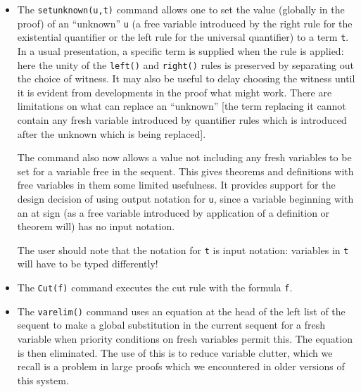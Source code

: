 \documentclass{article}
\begin{document}
\begin{itemize}
I have also added reflexivity of equality as an axiom, and the {\tt done()} command handles this.  This may have dynamic effects
if the prover can make the terms in an equation equal by setting unknowns suitably.  The other rules prove reflexivity of equality, but this
should remove lots of junk lines from proofs.

Where the {\tt done} command fails, one might want to use {\tt back()} to restore the previous state, because the prover might have
made undesired global substitutions for unknowns.

\item  The {\tt setunknown(u,t)} command allows one to set the value (globally in the proof) of an ``unknown'' {\tt u} (a free variable introduced by the right rule for the existential quantifier or the left rule for the universal quantifier) to a term {\tt t}.  In a usual presentation, a specific term is supplied when the rule is applied:  here the unity of the {\tt left()} and {\tt right()} rules is preserved by separating out the choice of witness.  It may also be useful to delay choosing the witness until it is evident from developments in the proof what might work.   There are limitations on what can replace an ``unknown'' [the term replacing it cannot contain any fresh variable introduced by quantifier rules which is introduced after the unknown which is being replaced].

The command also now allows a value not including any fresh variables to be set for a variable free in the sequent.  This gives theorems and definitions with free variables in them some limited usefulness.  It provides support for the design
decision of using output notation for {\tt u}, since a variable beginning with an at sign (as a free variable introduced by application of a definition or theorem will) has no input notation.

The user should note that the notation for {\tt t} is input notation:  variables in {\tt t} will have to be typed differently!

\item  The {\tt Cut(f)} command executes the cut rule with the formula {\tt f}.

\item The {\tt varelim()} command uses an equation at the head of the left list of the sequent to make a global substitution in the current sequent for a fresh variable
when priority conditions on fresh variables permit this.  The equation is then eliminated.  The use of this is to reduce variable clutter, which we recall
is a problem in large proofs which we encountered in older versions of this system.


\end{itemize}
\end{document}
